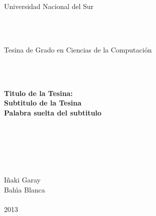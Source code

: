 
\vspace{3cm}

%

\begin{center}
\thispagestyle{empty}

\

\

\

\

\hspace{-5cm} %


\

{\Large {\sc Universidad Nacional del Sur}}\\

\

\

{\Large {\sc Tesina de Grado en Ciencias de la Computaci\'on}}\\


\

\

{\Large {\bf Titulo de la Tesina:}}\\ 
\vspace{2mm}
{\Large {\bf Subtitulo de la Tesina}} \\
\vspace{1mm}
{\Large {\bf Palabra suelta del subtitulo}}

\

\

\

{\Large I\~{n}aki Garay}\\
\vspace{4cm}
{\Large {\sc Bah\'\i a Blanca}\hspace{6cm}{\sc Argentina}}\\
\ \\
{\Large 2013}\ 

\end{center}

\break
